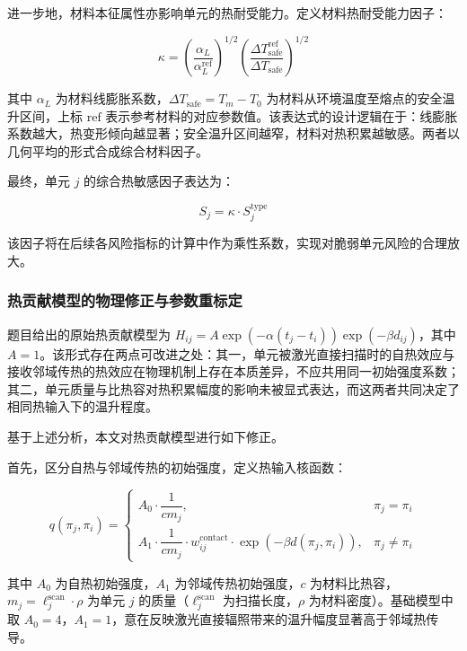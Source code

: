 \documentclass[a4paper, 12pt]{ctexart}
\begin{document}
进一步地，材料本征属性亦影响单元的热耐受能力。定义材料热耐受能力因子：

\begin{equation}
    \kappa = \left( \frac{\alpha_L}{\alpha_L^{\text{ref}}} \right)^{1/2} \left( \frac{\Delta T_{\text{safe}}^{\text{ref}}}{\Delta T_{\text{safe}}} \right)^{1/2}
\end{equation}

其中 $\alpha_L$ 为材料线膨胀系数，$\Delta T_{\text{safe}} = T_m - T_0$ 为材料从环境温度至熔点的安全温升区间，上标 $\text{ref}$ 表示参考材料的对应参数值。该表达式的设计逻辑在于：线膨胀系数越大，热变形倾向越显著；安全温升区间越窄，材料对热积累越敏感。两者以几何平均的形式合成综合材料因子。

最终，单元 $j$ 的综合热敏感因子表达为：

\begin{equation}
    S_j = \kappa \cdot S_j^{\text{type}}
\end{equation}

该因子将在后续各风险指标的计算中作为乘性系数，实现对脆弱单元风险的合理放大。

\subsubsection{热贡献模型的物理修正与参数重标定}

题目给出的原始热贡献模型为 $H_{ij} = A \exp(-\alpha (t_j - t_i)) \exp(-\beta d_{ij})$，其中 $A=1$。该形式存在两点可改进之处：其一，单元被激光直接扫描时的自热效应与接收邻域传热的热效应在物理机制上存在本质差异，不应共用同一初始强度系数；其二，单元质量与比热容对热积累幅度的影响未被显式表达，而这两者共同决定了相同热输入下的温升程度。

基于上述分析，本文对热贡献模型进行如下修正。

首先，区分自热与邻域传热的初始强度，定义热输入核函数：

\begin{equation}
    q(\pi_j, \pi_i) = 
    \begin{cases}
        A_0 \cdot \dfrac{1}{c m_j}, & \pi_j = \pi_i \\[1em]
        A_1 \cdot \dfrac{1}{c m_j} \cdot w_{ij}^{\text{contact}} \cdot \exp\left(-\beta d(\pi_j, \pi_i)\right), & \pi_j \neq \pi_i
    \end{cases}
\end{equation}

其中 $A_0$ 为自热初始强度，$A_1$ 为邻域传热初始强度，$c$ 为材料比热容，$m_j = \ell_j^{\text{scan}} \cdot \rho$ 为单元 $j$ 的质量（$\ell_j^{\text{scan}}$ 为扫描长度，$\rho$ 为材料密度）。基础模型中取 $A_0 = 4$，$A_1 = 1$，意在反映激光直接辐照带来的温升幅度显著高于邻域热传导。
\end{document}
